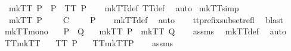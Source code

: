 \begin{isabellebody}
\ \ {\isachardoublequoteopen}{\isacharparenleft}mkTT{}\ P\ {\isacharequal}\ P{\isacharparenright}\ {\isacharequal}\ TT{}\ P{\isachardoublequoteclose}\isanewline
%
\isadelimproof
\ \ %
\endisadelimproof
%
\isatagproof
{}\isamarkupfalse%
\ mkTT{}{\isacharunderscore}def\ TT{}{\isacharunderscore}def\ \isamarkupfalse%
\ auto%
\endisatagproof
{\isafoldproof}%
%
\isadelimproof
\isanewline
%
\endisadelimproof
\isanewline
{}\isamarkupfalse%
\ mkTT{}{\isacharunderscore}simp{\isacharcolon}\isanewline
\ \ {\isachardoublequoteopen}mkTT{}\ P\ {\isacharequal}\ {\isacharbraceleft}{\isasymrho}{\isacharbar}{\isasymrho}\ {\isasymsigma}{\isachardot}\ {\isasymrho}\ {\isasymlesssim}\isactrlsub C\ {\isasymsigma}\ {\isasymand}\ {\isasymsigma}\ {\isasymin}\ P{\isacharbraceright}{\isachardoublequoteclose}\isanewline
%
\isadelimproof
\ \ %
\endisadelimproof
%
\isatagproof
{}\isamarkupfalse%
\ mkTT{}{\isacharunderscore}def\ \isamarkupfalse%
\ auto\isanewline
\ \ \isamarkupfalse%
\ tt{\isacharunderscore}prefix{\isacharunderscore}subset{\isacharunderscore}refl\ \isamarkupfalse%
\ blast%
\endisatagproof
{\isafoldproof}%
%
\isadelimproof
\isanewline
%
\endisadelimproof
\isanewline
{}\isamarkupfalse%
\ mkTT{}{\isacharunderscore}mono{\isacharcolon}\isanewline
\ \ \ {\isachardoublequoteopen}P\ {\isasymsubseteq}\ Q{\isachardoublequoteclose}\isanewline
\ \ \ {\isachardoublequoteopen}mkTT{}\ P\ {\isasymsubseteq}\ mkTT{}\ Q{\isachardoublequoteclose}\isanewline
%
\isadelimproof
\ \ %
\endisadelimproof
%
\isatagproof
{}\isamarkupfalse%
\ assms\ \isamarkupfalse%
\ mkTT{}{\isacharunderscore}def\ \isamarkupfalse%
\ auto%
\endisatagproof
{\isafoldproof}%
%
\isadelimproof
\isanewline
%
\endisadelimproof
\isanewline
{}\isamarkupfalse%
\ TT{}{\isacharunderscore}mkTT{}{\isacharcolon}\isanewline
\ \ \ {\isachardoublequoteopen}TT{}\ P{\isachardoublequoteclose}\isanewline
\ \ \ {\isachardoublequoteopen}TT{}{\isacharparenleft}mkTT{}{\isacharparenleft}P{\isacharparenright}{\isacharparenright}{\isachardoublequoteclose}\isanewline
%
\isadelimproof
\ \ %
\endisadelimproof
%
\isatagproof
{}\isamarkupfalse%
\ assms\ \isamarkupfalse%

\end{isabellebody}
